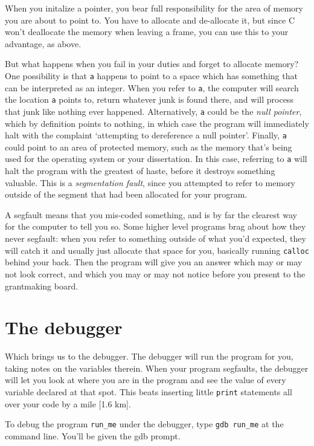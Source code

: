 \documentclass[12pt]{article}
\begin{document}
When you initalize a pointer, you bear full responsibility for the area
of memory you are about to point to. You have to allocate and de-allocate
it, but since C won't deallocate the memory when leaving a frame, you
can use this to your advantage, as above.

But what happens when you fail in your duties and forget to allocate
memory? One possibility is that {\tt a} happens to point to a space
which has something that can be interpreted as an integer. When you refer
to {\tt *a}, the computer will search the location {\tt a}
points to, return whatever junk is found there, and will process that
junk like nothing ever happened. Alternatively, {\tt a} could be the
{\sl null pointer},  which by definition points to nothing, in which
case the program will immediately halt with the complaint `attempting to
dereference a null pointer'. Finally, {\tt a} could point to an area of
protected memory, such as the memory that's being used for the operating
system or your dissertation. In this case, referring to {\tt *a} will
halt the program with the greatest of haste, before it destroys something
valuable. This is a {\sl segmentation fault}, since you attempted to refer
to memory outside of the segment that had been allocated for your program.

A segfault means that you mis-coded something, and 
is by far the clearest way for the computer to tell you so. Some higher level
programs brag about how they never segfault: when you refer to something
outside of what you'd expected, they will catch it and usually just
allocate that space for you, basically running {\tt calloc} behind your
back. Then the program will give you an answer which may or may not look
correct, and which you may or may not notice before you present to the
grantmaking board. 

\section{The debugger}   \label{debug}
Which brings us to the debugger. The debugger will run the program for
you, taking notes on the variables therein. When your program segfaults,
the debugger will let you look at where you
are in the program and see the value of every variable declared at that
spot. This beats inserting little {\tt print} statements all over your
code by a mile [1.6 km].

To debug the program {\tt run\_me} under the debugger, type {\tt gdb
run\_me} at the command line.  You'll be given the gdb prompt.
\end{document}
